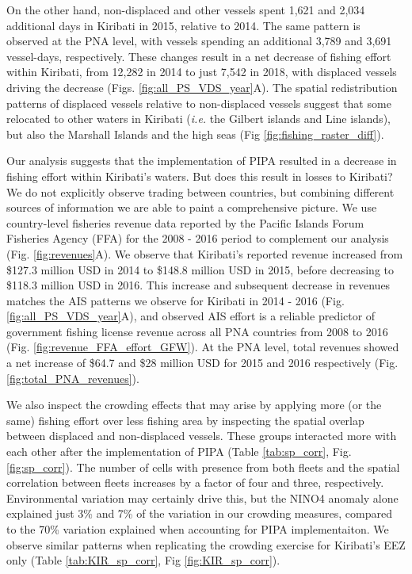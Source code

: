\documentclass[12pt]{article}
\begin{document}
On the other hand, non-displaced and other vessels spent 1,621 and 2,034 additional days in Kiribati in 2015, relative to 2014. The same pattern is observed at the PNA level, with vessels spending an additional 3,789 and 3,691 vessel-days, respectively. These changes result in a net decrease of fishing effort within Kiribati, from 12,282 in 2014 to just 7,542 in 2018, with displaced vessels driving the decrease (Figs. \ref{fig:all_PS_VDS_year}A). The spatial redistribution patterns of displaced vessels relative to non-displaced vessels suggest that some relocated to other waters in Kiribati (\emph{i.e.} the Gilbert islands and Line islands), but also the Marshall Islands and the high seas (Fig \ref{fig:fishing_raster_diff}).

Our analysis suggests that the implementation of PIPA resulted in a decrease in fishing effort within Kiribati's waters. But does this result in losses to Kiribati? We do not explicitly observe trading between countries, but combining different sources of information we are able to paint a comprehensive picture. We use country-level fisheries revenue data reported by the Pacific Islands Forum Fisheries Agency (FFA) for the 2008 - 2016 period to complement our analysis (Fig. \ref{fig:revenues}A). We observe that Kiribati's reported revenue increased from \$127.3 million USD in 2014 to \$148.8 million USD in 2015, before decreasing to \$118.3 million USD in 2016. This increase and subsequent decrease in revenues matches the AIS patterns we observe for Kiribati in 2014 - 2016 (Fig. \ref{fig:all_PS_VDS_year}A), and observed AIS effort is a reliable predictor of government fishing license revenue across all PNA countries from 2008 to 2016 (Fig. \ref{fig:revenue_FFA_effort_GFW}). At the PNA level, total revenues showed a net increase of \$64.7 and \$28 million USD for 2015 and 2016 respectively (Fig. \ref{fig:total_PNA_revenues}).

We also inspect the crowding effects that may arise by applying more (or the same) fishing effort over less fishing area by inspecting the spatial overlap between displaced and non-displaced vessels. These groups interacted more with each other after the implementation of PIPA (Table \ref{tab:sp_corr}, Fig. \ref{fig:sp_corr}). The number of cells with presence from both fleets and the spatial correlation between fleets increases by a factor of four and three, respectively. Environmental variation may certainly drive this, but the NINO4 anomaly alone explained just 3\% and 7\% of the variation in our crowding measures, compared to the 70\% variation explained when accounting for PIPA implementaiton. We observe similar patterns when replicating the crowding exercise for Kiribati's EEZ only (Table \ref{tab:KIR_sp_corr}, Fig \ref{fig:KIR_sp_corr}).
\end{document}
